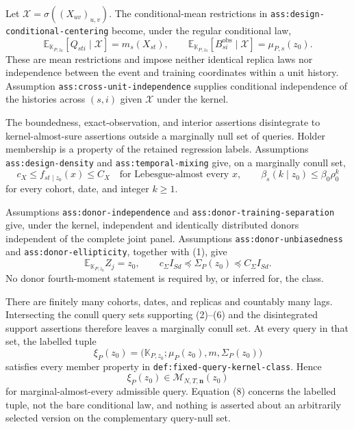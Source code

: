 Let \(\mathcal X=\sigma((X_{uv})_{u,v})\).  The conditional-mean restrictions in \texttt{ass:design-conditional-centering} become, under the regular conditional law,
\[
 \mathbb E_{\mathbb K_{P,z_0}}[Q_{sti}\mid\mathcal X]
 =m_s(X_{st}),
 \qquad
 \mathbb E_{\mathbb K_{P,z_0}}
 [B_{si}^{\mathrm{obs}}\mid\mathcal X]
 =\mu_{P,s}(z_0).                                           \tag{4}
\]
These are mean restrictions and impose neither identical replica laws nor independence between the event and training coordinates within a unit history.  Assumption \texttt{ass:cross-unit-independence} supplies conditional independence of the histories across \((s,i)\) given \(\mathcal X\) under the kernel.

The boundedness, exact-observation, and interior assertions disintegrate to kernel-almost-sure assertions outside a marginally null set of queries.  Holder membership is a property of the retained regression labels.  Assumptions \texttt{ass:design-density} and \texttt{ass:temporal-mixing} give, on a marginally conull set,
\[
 c_X\le f_{st\mid z_0}(x)\le C_X
 \quad\text{for Lebesgue-almost every }x,
 \qquad
 \beta_s(k\mid z_0)\le\beta_0\rho_0^k                    \tag{5}
\]
for every cohort, date, and integer \(k\ge1\).

Assumptions \texttt{ass:donor-independence} and
\texttt{ass:donor-training-separation} give, under the kernel, independent and identically distributed donors independent of the complete joint panel.  Assumptions \texttt{ass:donor-unbiasedness} and \texttt{ass:donor-ellipticity}, together with (1), give
\[
 \mathbb E_{\mathbb K_{P,z_0}}Z_j=z_0,
 \qquad
 c_\Sigma I_{Sd}\preceq\Sigma_P(z_0)
 \preceq C_\Sigma I_{Sd}.                                  \tag{6}
\]
No donor fourth-moment statement is required by, or inferred for, the class.

There are finitely many cohorts, dates, and replicas and countably many lags.  Intersecting the conull query sets supporting (2)--(6) and the disintegrated support assertions therefore leaves a marginally conull set.  At every query in that set, the labelled tuple
\[
 \xi_P(z_0)=\bigl(\mathbb K_{P,z_0};\mu_P(z_0),m,
 \Sigma_P(z_0)\bigr)                                       \tag{7}
\]
satisfies every member property in \texttt{def:fixed-query-kernel-class}.  Hence
\[
 \xi_P(z_0)\in\mathcal M_{N,T,\mathbf n}(z_0)              \tag{8}
\]
for marginal-almost-every admissible query.  Equation (8) concerns the labelled tuple, not the bare conditional law, and nothing is asserted about an arbitrarily selected version on the complementary query-null set.

